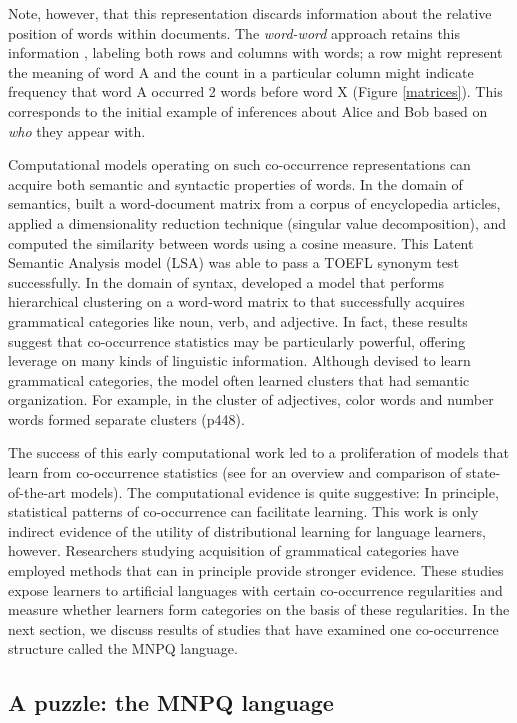 \documentclass[man,floatsintext]{apa6}
\begin{document}
Note, however, that this representation discards information about the relative position of words within documents. The \emph{word-word} approach retains this information \citep{church1990, schutze1992}, labeling both rows and columns with words; a row might represent the meaning of word A and the count in a particular column might indicate frequency that word A occurred 2 words before word X (Figure \ref{matrices}). This corresponds to the initial example of inferences about Alice and Bob based on \emph{who} they appear with.

Computational models operating on such co-occurrence representations can acquire both semantic and syntactic properties of words. In the domain of semantics, \citet{landauer1997} built a word-document matrix from a corpus of encyclopedia articles, applied a dimensionality reduction technique (singular value decomposition), and computed the similarity between words using a cosine measure. This Latent Semantic Analysis model (LSA) was able to pass a TOEFL synonym test successfully. In the domain of syntax, \citet{redington1998} developed a model that performs hierarchical clustering on a word-word matrix to that successfully acquires grammatical categories like noun, verb, and adjective. In fact, these results suggest that co-occurrence statistics may be particularly powerful, offering leverage on many kinds of linguistic information. Although devised to learn grammatical categories, the model often learned clusters that had semantic organization. For example, in the cluster of adjectives, color words and number words formed separate clusters (p448).

The success of this early computational work led to a proliferation of models that learn from co-occurrence statistics (see \citealp{riordan2010} for an overview and comparison of state-of-the-art models). The computational evidence is quite suggestive: In principle, statistical patterns of co-occurrence can facilitate learning. This work is only indirect evidence of the utility of distributional learning for language learners, however. Researchers studying acquisition of grammatical categories have employed methods that can in principle provide stronger evidence. These studies expose learners to artificial languages with certain co-occurrence regularities and measure whether learners form categories on the basis of these regularities. In the next section, we discuss results of studies that have examined one co-occurrence structure called the MNPQ language.

\subsection{A puzzle: the MNPQ language}
\end{document}
